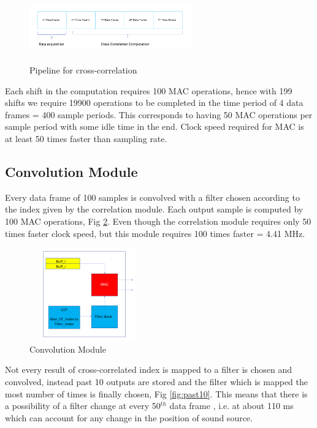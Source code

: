 \documentclass[conference]{IEEEtran}
\begin{document}
\begin{figure}
    \centering
    \includegraphics[height = 3cm, width = 7cm]{modified_xcorr.png}
    \caption{Pipeline for cross-correlation}
    \label{fig:modxcorr}
\end{figure}

Each shift in the computation requires 100 MAC operations, hence with 199 shifts we require 19900 operations to be completed in the time period of 4 data frames = 400 sample periods. This corresponds to having 50 MAC operations per sample period with some idle time in the end. Clock speed required for MAC is at least 50 times faster than sampling rate.

\subsection{Convolution Module}
Every data frame of 100 samples is convolved with a filter chosen according to the index given by the correlation module. Each output sample is computed by 100 MAC operations, Fig \ref{fig:conv_module}. Even though the correlation module requires only 50 times faster clock speed, but this module requires 100 times faster = 4.41 MHz. 

\begin{figure}
    \centering
    \includegraphics[width = 5cm, height = 4cm]{conv_module.png}
    \caption{Convolution Module}
    \label{fig:conv_module}
\end{figure}

Not every result of cross-correlated index is mapped to a filter is chosen and convolved, instead past 10 outputs are stored and the filter which is mapped the most number of times is finally chosen, Fig \ref{fig:past10}. This means that there is a possibility of a filter change at every 50$^{th}$ data frame , i.e. at about 110 ms which can account for any change in the position of sound source.
\end{document}
